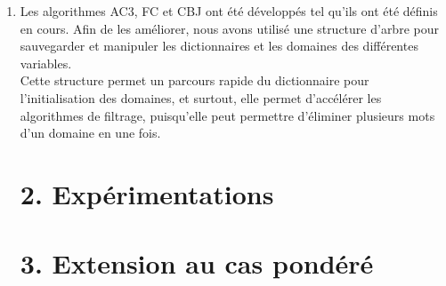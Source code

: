 \documentclass[a4paper,12pt]{report}
\begin{document}
\begin{enumerate}
\item Les algorithmes AC3, FC et CBJ ont été développés tel qu'ils ont été définis en cours. Afin de les améliorer, nous avons utilisé une structure d'arbre pour sauvegarder et manipuler les dictionnaires et les domaines des différentes variables.\\
 Cette structure permet un parcours rapide du dictionnaire pour l'initialisation des domaines, et surtout, elle permet d'accélérer les algorithmes de filtrage, puisqu'elle peut permettre d'éliminer plusieurs mots d'un domaine en une fois.\\

\section*{2. Expérimentations}

\section*{3. Extension au cas pondéré}


\end{enumerate}
\end{document}
